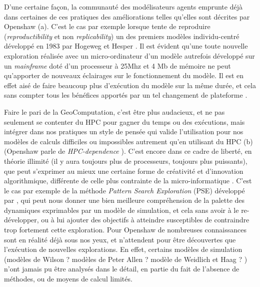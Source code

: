 D'une certaine façon, la communauté des modélisateurs agents emprunte déjà dans certaines de ces pratiques des améliorations telles qu'elles sont décrites par Openshaw (a). C'est le cas par exemple lorsque \autocite{Brearcliffe2014} tente de reproduire (\textit{reproductibility} et non \textit{replicability}) un des premiers modèles individu-centré développé en 1983 par Hogeweg et Hesper \autocite{Hogeweg1983}. Il est évident qu'une toute nouvelle exploration réalisée avec un micro-ordinateur d'un modèle autrefois développé sur un \textit{mainframe} doté d'un processeur à 25Mhz et 4 Mb de mémoire ne peut qu'apporter de nouveaux éclairages sur le fonctionnement du modèle. Il est en effet aisé de faire beaucoup plus d'exécution du modèle sur la même durée, et cela sans compter tous les bénéfices apportés par un tel changement de plateforme \autocite{Wilensky2007a}.

Faire le pari de la GeoComputation, c'est être plus audacieux, et ne pas seulement se contenter du HPC pour gagner du temps ou des exécutions, mais intégrer dans nos pratiques un style de pensée qui valide l'utilisation pour nos modèles de calculs difficiles ou impossibles autrement qu'en utilisant du HPC (b)(Openshaw parle de \textit{HPC-dependence} ). C'est encore dans ce cadre de liberté, en théorie illimité (il y aura toujours plus de processeurs, toujours plus puissants), que peut s'exprimer au mieux une certaine forme de créativité et d'innovation algorithmique, différente de celle plus contrainte de la micro-informatique \autocite[26-28]{Openshaw2000}. C'est le cas par exemple de la méthode \textit{Pattern Search Exploration} (PSE) développé par \textcite{Cherel2015}, qui peut nous donner une bien meilleure compréhension de la palette des dynamiques exprimables par un modèle de simulation, et cela sans avoir à le re-développer, ou à lui ajouter des objectifs à atteindre susceptibles de contraindre trop fortement cette exploration. Pour Openshaw de nombreuses connaissances sont en réalité déjà sous nos yeux, et n'attendent pour être découvertes que l'exécution de nouvelles explorations. En effet, certains modèles de simulation (modèles de Wilson ? modèles de Peter Allen ? modèle de Weidlich et Haag ? ) n'ont jamais pu être analysés dans le détail, en partie du fait de l'absence de méthodes, ou de moyens de calcul limités.

